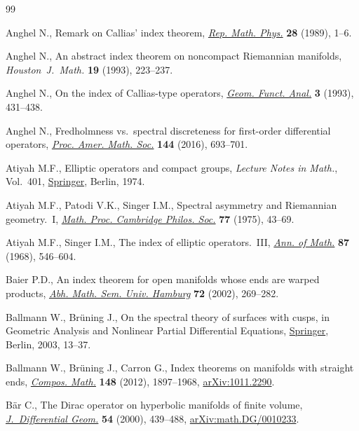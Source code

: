 \begin{thebibliography}{99}
\footnotesize\itemsep=0pt

Anghel N., Remark on {C}allias' index theorem, \href{https://doi.org/10.1016/0034-4877(89)90022-0}{\textit{Rep. Math. Phys.}}
 \textbf{28} (1989), 1--6.

Anghel N., An abstract index theorem on noncompact {R}iemannian manifolds,
 \textit{Houston~J.~Math.} \textbf{19} (1993), 223--237.

Anghel N., On the index of {C}allias-type operators, \href{https://doi.org/10.1007/BF01896237}{\textit{Geom. Funct.
 Anal.}} \textbf{3} (1993), 431--438.

Anghel N., Fredholmness vs.\ spectral discreteness for first-order differential
 operators, \href{https://doi.org/10.1090/proc12741}{\textit{Proc. Amer. Math. Soc.}} \textbf{144} (2016), 693--701.

Atiyah M.F., Elliptic operators and compact groups, \textit{Lecture Notes in
 Math.}, Vol.~401, \href{https://doi.org/10.1007/BFb0057821}{Springer}, Berlin, 1974.

Atiyah M.F., Patodi V.K., Singer I.M., Spectral asymmetry and {R}iemannian
 geometry.~{I}, \href{https://doi.org/10.1017/S0305004100049410}{\textit{Math. Proc. Cambridge Philos. Soc.}} \textbf{77}
 (1975), 43--69.

Atiyah M.F., Singer I.M., The index of elliptic operators.~{III}, \href{https://doi.org/10.2307/1970717}{\textit{Ann.
 of Math.}} \textbf{87} (1968), 546--604.

Baier P.D., An index theorem for open manifolds whose ends are warped products,
 \href{https://doi.org/10.1007/BF02941677}{\textit{Abh. Math. Sem. Univ. Hamburg}} \textbf{72} (2002), 269--282.

Ballmann W., Br\"uning J., On the spectral theory of surfaces with cusps, in
 Geometric Analysis and Nonlinear Partial Differential Equations, \href{https://doi.org/10.1007/978-3-642-55627-2_2}{Springer},
 Berlin, 2003, 13--37.

Ballmann W., Br\"uning J., Carron G., Index theorems on manifolds with straight
 ends, \href{https://doi.org/10.1112/S0010437X12000401}{\textit{Compos. Math.}} \textbf{148} (2012), 1897--1968,
 \href{https://arxiv.org/abs/1011.2290}{arXiv:1011.2290}.

B\"ar C., The {D}irac operator on hyperbolic manifolds of finite volume,
 \href{https://doi.org/10.4310/jdg/1214339790}{\textit{J.~Differential Geom.}} \textbf{54} (2000), 439--488,
 \href{https://arxiv.org/abs/math.DG/0010233}{arXiv:math.DG/0010233}.


\end{thebibliography}
